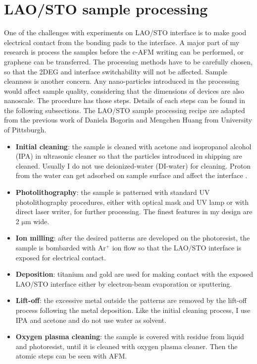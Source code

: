 \documentclass[pdflatex, sectionletters, 12pt]{pittetd}    %
\begin{document}
\section{LAO/STO sample processing}

One of the challenges with experiments on LAO/STO interface is to make good electrical contact from the bonding pads to the interface. A major part of my research is process the samples before the c-AFM writing can be performed, or graphene can be transferred. The processing methods have to be carefully chosen, so that the 2DEG and interface switchability will not be affected. Sample cleanness is another concern. Any nano-particles introduced in the processing would affect sample quality, considering that the dimensions of devices are also nanoscale. The procedure has those steps. Details of each steps can be found in the following subsections. The LAO/STO sample processing recipe are adapted from the previous work of Daniela Bogorin and Mengchen Huang from University of Pittsburgh.

\begin{itemize}
	
	\item \textbf{Initial cleaning}: the sample is cleaned with acetone and isopropanol alcohol (IPA) in ultrasonic cleaner so that the particles introduced in shipping are cleaned. Usually I do not use deionized-water (DI-water) for cleaning. Proton from the water can get adsorbed on sample surface and affect the interface \cite{xie2011control, brown2016giant, bi2010water}.
	
	\item \textbf{Photolithography}: the sample is patterned with standard UV photolithography procedures, either with optical mask and UV lamp or with direct laser writer, for further processing. The finest features in my design are 2 $\mathrm{\mu}$m wide.
	
	\item \textbf{Ion milling}: after the desired patterns are developed on the photoresist, the sample is bombarded with Ar$^+$ ion flow so that the LAO/STO interface is exposed for electrical contact.
	
	\item \textbf{Deposition}: titanium and gold are used for making contact with the exposed LAO/STO interface either by electron-beam evaporation or sputtering.
	
	\item \textbf{Lift-off}: the excessive metal outside the patterns are removed by the lift-off process following the metal deposition. Like the initial cleaning process, I use IPA and acetone and do not use water as solvent.
	
	\item \textbf{Oxygen plasma cleaning}: the sample is covered with residue from liquid and photoresist, until it is cleaned with oxygen plasma cleaner. Then the atomic steps can be seen with AFM.
	
\end{itemize}
\end{document}
